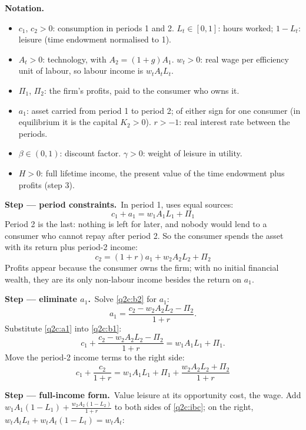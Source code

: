 \documentclass[11pt,a4paper]{article}
\newcommand{\passo}[2]{\par\smallskip\noindent\textbf{Step --- #1.}~#2}
\newenvironment{notacao}{\par\smallskip\noindent\textbf{Notation.}\begin{itemize}[leftmargin=1.4em,topsep=1pt,itemsep=0pt]\small}{\end{itemize}}
\begin{document}
\begin{sol}
\begin{notacao}
\item $c_1$, $c_2>0$: consumption in periods 1 and 2. $L_t\in[0,1]$: hours worked; $1-L_t$: leisure
(time endowment normalised to 1).
\item $A_t>0$: technology, with $A_2=(1+g)A_1$. $w_t>0$: real wage per efficiency unit of labour, so
labour income is $w_tA_tL_t$.
\item $\Pi_1$, $\Pi_2$: the firm's profits, paid to the consumer who owns it.
\item $a_1$: asset carried from period 1 to period 2; of either sign for one consumer (in
equilibrium it is the capital $K_2>0$). $r>-1$: real interest rate between the periods.
\item $\beta\in(0,1)$: discount factor. $\gamma>0$: weight of leisure in utility.
\item $H>0$: full lifetime income, the present value of the time endowment plus profits (step 3).
\end{notacao}
\passo{period constraints}{In period 1, uses equal sources:}
\begin{equation}
\boxed{c_1+a_1=w_1A_1L_1+\Pi_1} \label{q2c:b1}
\end{equation}
Period 2 is the last: nothing is left for later, and nobody would lend to a consumer who cannot
repay after period 2. So the consumer spends the asset with its return plus period-2 income:
\begin{equation}
\boxed{c_2=(1+r)a_1+w_2A_2L_2+\Pi_2} \label{q2c:b2}
\end{equation}
Profits appear because the consumer owns the firm; with no initial financial wealth, they are its
only non-labour income besides the return on $a_1$.
\passo{eliminate $a_1$}{Solve \eqref{q2c:b2} for $a_1$:}
\begin{equation}
a_1=\frac{c_2-w_2A_2L_2-\Pi_2}{1+r}. \label{q2c:a1}
\end{equation}
Substitute \eqref{q2c:a1} into \eqref{q2c:b1}:
\[
c_1+\frac{c_2-w_2A_2L_2-\Pi_2}{1+r}=w_1A_1L_1+\Pi_1 .
\]
Move the period-2 income terms to the right side:
\begin{equation}
\boxed{c_1+\frac{c_2}{1+r}=w_1A_1L_1+\Pi_1+\frac{w_2A_2L_2+\Pi_2}{1+r}} \label{q2c:ibc}
\end{equation}
\passo{full-income form}{Value leisure at its opportunity cost, the wage. Add
$w_1A_1(1-L_1)+\frac{w_2A_2(1-L_2)}{1+r}$ to both sides of \eqref{q2c:ibc}; on the right,
$w_tA_tL_t+w_tA_t(1-L_t)=w_tA_t$:}

\end{sol}
\end{document}

